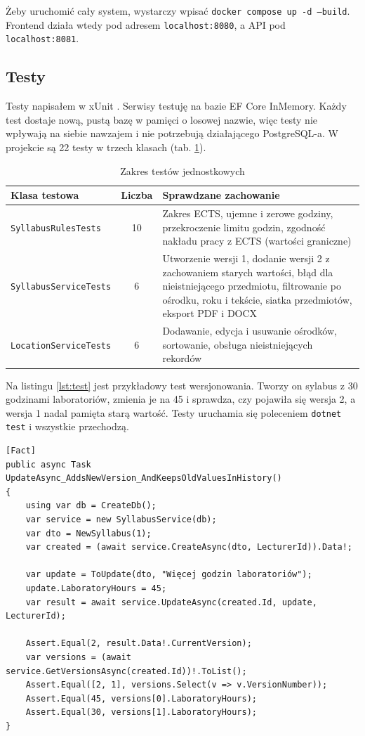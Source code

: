 \documentclass[times]{san}
\begin{document}
Żeby uruchomić cały system, wystarczy wpisać \texttt{docker compose up -d --build}. Frontend działa wtedy pod adresem \texttt{localhost:8080}, a API pod \texttt{localhost:8081}.

\subsection{Testy}

Testy napisałem w xUnit \cite{xunit}. Serwisy testuję na bazie EF Core InMemory. Każdy test dostaje nową, pustą bazę w pamięci o losowej nazwie, więc testy nie wpływają na siebie nawzajem i nie potrzebują działającego PostgreSQL-a. W projekcie są 22 testy w trzech klasach (tab. \ref{tab:testy}).

\begin{table}[H]
\centering
\caption{Zakres testów jednostkowych}
\label{tab:testy}
\small
\begin{tabularx}{\textwidth}{|l|c|X|}
\hline
\textbf{Klasa testowa} & \textbf{Liczba} & \textbf{Sprawdzane zachowanie} \\
\hline
\texttt{SyllabusRulesTests} & 10 & Zakres ECTS, ujemne i zerowe godziny, przekroczenie limitu godzin, zgodność nakładu pracy z ECTS (wartości graniczne) \\
\hline
\texttt{SyllabusServiceTests} & 6 & Utworzenie wersji 1, dodanie wersji 2 z zachowaniem starych wartości, błąd dla nieistniejącego przedmiotu, filtrowanie po ośrodku, roku i tekście, siatka przedmiotów, eksport PDF i DOCX \\
\hline
\texttt{LocationServiceTests} & 6 & Dodawanie, edycja i usuwanie ośrodków, sortowanie, obsługa nieistniejących rekordów \\
\hline
\end{tabularx}
\end{table}

Na listingu \ref{lst:test} jest przykładowy test wersjonowania. Tworzy on sylabus z 30 godzinami laboratoriów, zmienia je na 45 i sprawdza, czy pojawiła się wersja 2, a wersja 1 nadal pamięta starą wartość. Testy uruchamia się poleceniem \texttt{dotnet test} i wszystkie przechodzą.

\begin{lstlisting}[language={[Sharp]C}, caption={Test wersjonowania sylabusa}, label={lst:test}]
[Fact]
public async Task UpdateAsync_AddsNewVersion_AndKeepsOldValuesInHistory()
{
    using var db = CreateDb();
    var service = new SyllabusService(db);
    var dto = NewSyllabus(1);
    var created = (await service.CreateAsync(dto, LecturerId)).Data!;

    var update = ToUpdate(dto, "Więcej godzin laboratoriów");
    update.LaboratoryHours = 45;
    var result = await service.UpdateAsync(created.Id, update, LecturerId);

    Assert.Equal(2, result.Data!.CurrentVersion);
    var versions = (await service.GetVersionsAsync(created.Id))!.ToList();
    Assert.Equal([2, 1], versions.Select(v => v.VersionNumber));
    Assert.Equal(45, versions[0].LaboratoryHours);
    Assert.Equal(30, versions[1].LaboratoryHours);
}
\end{lstlisting}
\end{document}
